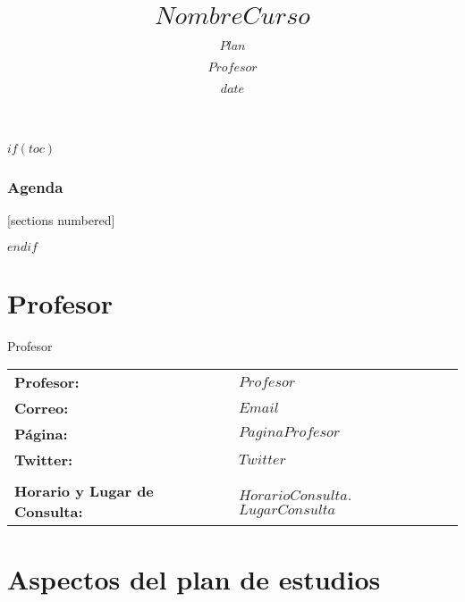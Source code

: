 \documentclass[10pt]{beamer}
\title{$NombreCurso$}
\subtitle{$Plan$}
\author{$Profesor$}
\date{$date$}
\institute{$Instituto$}
\let\oldtextbf\textbf
\renewcommand{\textbf}[1]{\textcolor{alerted text.fg}{\oldtextbf{#1}}}
\begin{document}
\spanishsignitems

\maketitle

$if(toc)$

\begin{frame}
  \frametitle{Agenda}
  [sections numbered]
  \tableofcontents[hideallsubsections]
\end{frame}

$endif$

\section{Profesor}

\begin{frame}{Profesor}

  \begin{tabularx}{\textwidth}{p{3cm}p{5.5cm}}
        \textbf{Profesor:}                  & $Profesor$         \\
        \textbf{Correo:}                            & $Email$         \\
        \textbf{Página:}                     & $PaginaProfesor$           \\
        \textbf{Twitter:}                     & $Twitter$           \\
                                                    &                       \\
        \textbf{Horario y Lugar de Consulta:}       & $HorarioConsulta$. $LugarConsulta$  \\
    \end{tabularx}

\end{frame}

\section{Aspectos del plan de estudios}
\end{document}
